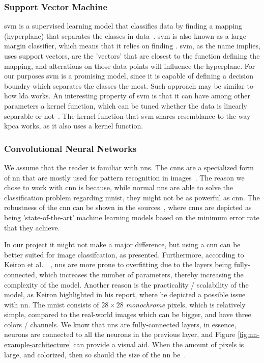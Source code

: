 \subsubsection{Support Vector Machine}\label{subsubsec:support-vector-machine}
\gls{svm} is a supervised learning model that classifies data by finding a mapping (hyperplane) that separates the classes in data~\cite{faster-svm}. \gls{svm} is also known as a large-margin classifier, which means that it relies on finding . \gls{svm}, as the name implies, uses support vectors, are the 'vectors' that are closest to the function defining the mapping, and alterations on those data points will influence the hyperplane. For our purposes \gls{svm} is a promising model, since it is capable of defining a decision boundry which separates the classes the most. Such approach may be similar to how \gls{lda} works. An interesting property of \gls{svm} is that it can have among other parameters a kernel function, which can be tuned whether the data is linearly separable or not~\cite{faster-svm}. The kernel function that \gls{svm} shares resemblance to the way \gls{kpca} works, as it also uses a kernel function.


\subsubsection{Convolutional Neural Networks}\label{subsubsec:convolutional-neural-networks}
We assume that the reader is familiar with \gls{nn}s. The \gls{cnn}s are a specialized form of \gls{nn} that are mostly used for pattern recognition in images~\cite{introduction-to-cnn}. The reason we chose to work with \gls{cnn} is because, while normal \gls{nn}s are able to solve the classification problem regarding \gls{mnist}, they might not be as powerful as \gls{cnn}. The robustness of the \gls{cnn} can be shown in the sources~\cite{lecun-mnist-database, mnist-classification-benchmark}, where \gls{cnn}s are depicted as being 'state-of-the-art' machine learning models based on the minimum error rate that they achieve.


In our project it might not make a major difference, but using a \gls{cnn} can be better suited for image classifcation, as presented. Furthermore, according to Keiron et al.\ ~\cite{introduction-to-cnn}, \gls{nn}s are more prone to overfitting due to the layers being fully-connected, which increases the number of parameters, thereby increasing the complexity of the model. Another reason is the practicality / scalability of the model, as Keiron highlighted in his report, where he depicted a possible issue with \gls{nn}. The \gls{mnist} consists of $28 \times 28$ \textit{monochrome} pixels, which is relatively simple, compared to the real-world images which can be bigger, and have three colors / channels. We know that \gls{nn}s are fully-connected layers, in essence, neurons are connected to all the neurons in the previous layer, and Figure \ref{fig:nn-example-architecture} can provide a visual aid. When the amount of pixels is large, and colorized, then so should the size of the \gls{nn} be~\cite{introduction-to-cnn}.

